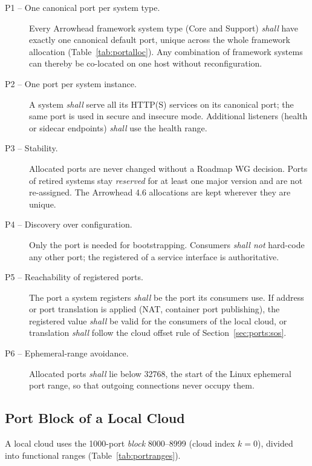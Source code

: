\begin{description}
  \item[P1 -- One canonical port per system type.] Every Arrowhead framework system type (Core
        and Support) \emph{shall} have exactly one canonical default port, unique across the
        whole framework allocation (Table~\ref{tab:portalloc}). Any combination of framework
        systems can thereby be co-located on one host without reconfiguration.
  \item[P2 -- One port per system instance.] A system \emph{shall} serve all its HTTP(S)
        services on its canonical port; the same port is used in secure and insecure mode.
        Additional listeners (health or sidecar endpoints) \emph{shall} use the health range.
  \item[P3 -- Stability.] Allocated ports are never changed without a Roadmap WG decision. Ports
        of retired systems stay \emph{reserved} for at least one major version and are not
        re-assigned. The Arrowhead 4.6 allocations are kept wherever they are unique.
  \item[P4 -- Discovery over configuration.] Only the  port is needed for
        bootstrapping. Consumers \emph{shall not} hard-code any other port; the registered
         of a service interface is authoritative.
  \item[P5 -- Reachability of registered ports.] The port a system registers \emph{shall} be
        the port its consumers use. If address or port translation is applied (NAT, container
        port publishing), the registered value \emph{shall} be valid for the consumers of the
        local cloud, or translation \emph{shall} follow the cloud offset rule of
        Section~\ref{sec:ports:sos}.
  \item[P6 -- Ephemeral-range avoidance.] Allocated ports \emph{shall} lie below 32768, the
        start of the Linux ephemeral port range, so that outgoing connections never occupy them.
\end{description}

\subsection{Port Block of a Local Cloud}
\label{sec:ports:lc}

A local cloud uses the 1000-port \emph{block} 8000--8999 (cloud index $k=0$), divided into
functional ranges (Table~\ref{tab:portranges}).

